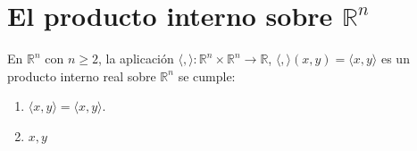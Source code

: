 \documentclass[a4paper]{scrreprt}
\providecommand{\inner}[2]{#1,#2}
\begin{document}
\section{El producto interno sobre $\mathds{R}^{n}$}
En $\mathds{R}^{n}$ con $n\geq2$, la aplicación $\langle,\rangle\colon\mathds{R}^{n}\times\mathds{R}^{n}\rightarrow\mathds{R}$, $\langle,\rangle\left(x,y\right)=\langle x,y\rangle$ es un producto interno real sobre $\mathds{R}^{n}$ se cumple:
\begin{enumerate}
	\item $\langle x,y\rangle=\langle x,y\rangle$.
	\item $\inner{x}{y}$
\end{enumerate}
\end{document}
